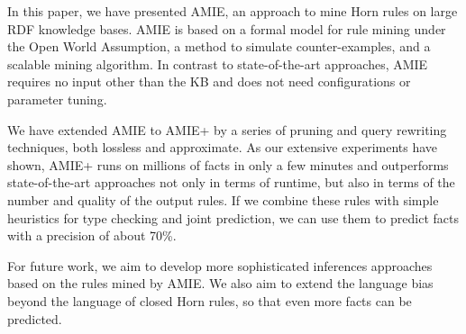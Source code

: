 
In this paper, we have presented AMIE, an approach to mine Horn rules on large RDF knowledge bases. AMIE is based on a formal model for rule mining under the Open World Assumption, a method to simulate counter-examples, and a scalable mining algorithm. In contrast to state-of-the-art approaches, AMIE requires no input other than the KB and does not need configurations or parameter tuning.

We have extended AMIE to AMIE+ by a series of pruning and query rewriting techniques, both lossless and approximate.
As our extensive experiments have shown, AMIE+ runs on millions of facts in only a few minutes and outperforms state-of-the-art approaches not only in terms of runtime,
but also in terms of the number and quality of the output rules.
If we combine these rules with simple heuristics for type checking and joint prediction, we can use them to predict facts with a precision of about 70\%.

For future work, we aim to develop more sophisticated inferences approaches based on the rules mined by AMIE. We also aim to extend the language bias beyond the language of closed Horn rules,
so that even more facts can be predicted.

